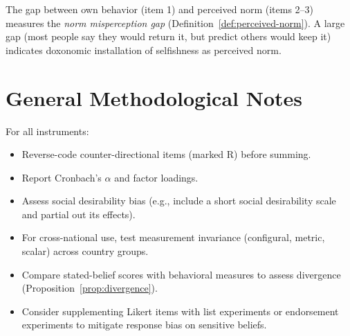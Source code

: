 The gap between own behavior (item 1) and perceived norm (items 2--3) measures the \emph{norm misperception gap} (Definition~\ref{def:perceived-norm}).
A large gap (most people say they would return it, but predict others would keep it) indicates doxonomic installation of selfishness as perceived norm.

\section*{General Methodological Notes}

For all instruments:
\begin{itemize}[nosep]
  \item Reverse-code counter-directional items (marked R) before summing.
  \item Report Cronbach's $\alpha$ and factor loadings.
  \item Assess social desirability bias (e.g., include a short social desirability scale and partial out its effects).
  \item For cross-national use, test measurement invariance (configural, metric, scalar) across country groups.
  \item Compare stated-belief scores with behavioral measures to assess divergence (Proposition~\ref{prop:divergence}).
  \item Consider supplementing Likert items with list experiments or endorsement experiments to mitigate response bias on sensitive beliefs.
\end{itemize}
